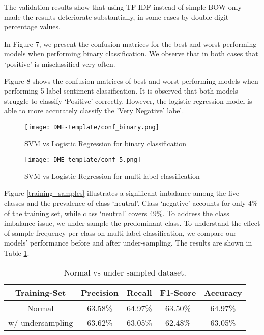 \documentclass{article}
\begin{document}
The validation results show that using TF-IDF instead of simple BOW only made the results deteriorate substantially, in some cases by double digit percentage values.

In Figure 7, we present the confusion matrices for the best and worst-performing models when performing binary classification. We observe that in both cases that `positive' is misclassified very often.

Figure 8 shows the confusion matrices of best and worst-performing models when performing 5-label sentiment classification. It is observed that both models struggle to classify `Positive' correctly. However, the logistic regression model is able to more accurately classify the 'Very Negative' label.

\begin{figure}[H]
    \centering
    \texttt{[image: DME-template/conf\_binary.png]}
    \caption{SVM vs Logistic Regression for binary classification}
\end{figure}

\begin{figure}[H]
    \centering
    \texttt{[image: DME-template/conf\_5.png]}
    \caption{SVM vs Logistic Regression for multi-label classification}
\end{figure}





Figure \ref{training_samples} illustrates a significant imbalance among the five classes and the prevalence of class ‘neutral’. Class ‘negative’ accounts for only 4\% of the training set, while class ‘neutral’ covers 49\%. To address the class imbalance issue, we under-sample the predominant class. To understand the effect of sample frequency per class on multi-label classification, we compare our models’ performance before and after under-sampling. The results are shown in Table \ref{tab:undersampled}.


\begin{table}[H]
\centering
\begin{tabular}{|c|cccc|}
\hline
Training-Set     & Precision & Recall  & F1-Score & Accuracy \\ \hline
Normal           & 63.58\%   & 64.97\% & 63.50\%  & 64.97\%  \\
w/ undersampling & 63.62\%   & 63.05\% & 62.48\%  & 63.05\%  \\ \hline
\end{tabular}
\caption{Normal vs under sampled dataset.}
\label{tab:undersampled}
\end{table}
\end{document}
